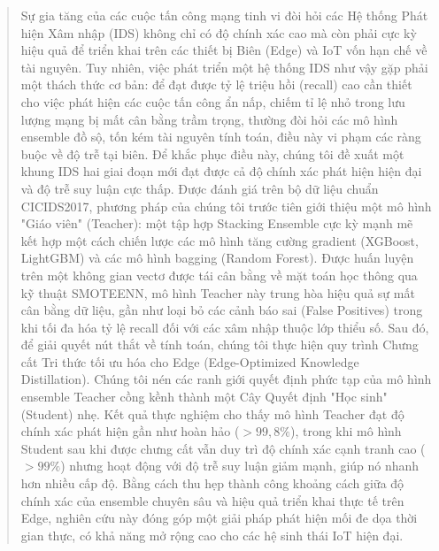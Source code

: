 \begin{abstract}
Sự gia tăng của các cuộc tấn công mạng tinh vi đòi hỏi các Hệ thống Phát hiện Xâm nhập (IDS) không chỉ có độ chính xác cao mà còn phải cực kỳ hiệu quả để triển khai trên các thiết bị Biên (Edge) và IoT vốn hạn chế về tài nguyên. Tuy nhiên, việc phát triển một hệ thống IDS như vậy gặp phải một thách thức cơ bản: để đạt được tỷ lệ triệu hồi (recall) cao cần thiết cho việc phát hiện các cuộc tấn công ẩn nấp, chiếm tỉ lệ nhỏ trong lưu lượng mạng bị mất cân bằng trầm trọng, thường đòi hỏi các mô hình ensemble đồ sộ, tốn kém tài nguyên tính toán, điều này vi phạm các ràng buộc về độ trễ tại biên. Để khắc phục điều này, chúng tôi đề xuất một khung IDS hai giai đoạn mới đạt được cả độ chính xác phát hiện hiện đại và độ trễ suy luận cực thấp. Được đánh giá trên bộ dữ liệu chuẩn CICIDS2017, phương pháp của chúng tôi trước tiên giới thiệu một mô hình "Giáo viên" (Teacher): một tập hợp Stacking Ensemble cực kỳ mạnh mẽ kết hợp một cách chiến lược các mô hình tăng cường gradient (XGBoost, LightGBM) và các mô hình bagging (Random Forest). Được huấn luyện trên một không gian vectơ được tái cân bằng về mặt toán học thông qua kỹ thuật SMOTEENN, mô hình Teacher này trung hòa hiệu quả sự mất cân bằng dữ liệu, gần như loại bỏ các cảnh báo sai (False Positives) trong khi tối đa hóa tỷ lệ recall đối với các xâm nhập thuộc lớp thiểu số. Sau đó, để giải quyết nút thắt về tính toán, chúng tôi thực hiện quy trình Chưng cất Tri thức tối ưu hóa cho Edge (Edge-Optimized Knowledge Distillation). Chúng tôi nén các ranh giới quyết định phức tạp của mô hình ensemble Teacher cồng kềnh thành một Cây Quyết định "Học sinh" (Student) nhẹ. Kết quả thực nghiệm cho thấy mô hình Teacher đạt độ chính xác phát hiện gần như hoàn hảo ($>99,8\%$), trong khi mô hình Student sau khi được chưng cất vẫn duy trì độ chính xác cạnh tranh cao ($>99\%$) nhưng hoạt động với độ trễ suy luận giảm mạnh, giúp nó nhanh hơn nhiều cấp độ. Bằng cách thu hẹp thành công khoảng cách giữa độ chính xác của ensemble chuyên sâu và hiệu quả triển khai thực tế trên Edge, nghiên cứu này đóng góp một giải pháp phát hiện mối đe dọa thời gian thực, có khả năng mở rộng cao cho các hệ sinh thái IoT hiện đại.
\end{abstract}

